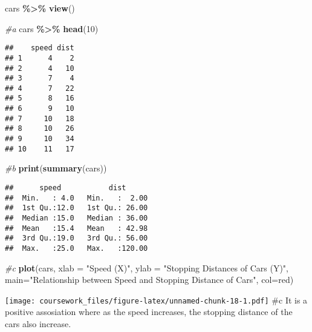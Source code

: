 \documentclass[
]{article}
\newenvironment{Shaded}{\begin{snugshade}}{\end{snugshade}}
\newcommand{\AttributeTok}[1]{\textcolor[rgb]{0.13,0.29,0.53}{#1}}
\newcommand{\CommentTok}[1]{\textcolor[rgb]{0.56,0.35,0.01}{\textit{#1}}}
\newcommand{\DecValTok}[1]{\textcolor[rgb]{0.00,0.00,0.81}{#1}}
\newcommand{\FunctionTok}[1]{\textcolor[rgb]{0.13,0.29,0.53}{\textbf{#1}}}
\newcommand{\NormalTok}[1]{#1}
\newcommand{\SpecialCharTok}[1]{\textcolor[rgb]{0.81,0.36,0.00}{\textbf{#1}}}
\newcommand{\StringTok}[1]{\textcolor[rgb]{0.31,0.60,0.02}{#1}}
\begin{document}
\begin{Shaded}
\begin{Highlighting}[]
\NormalTok{cars }\SpecialCharTok{\%\textgreater{}\%}
  \FunctionTok{view}\NormalTok{()}
\end{Highlighting}
\end{Shaded}

\begin{Shaded}
\begin{Highlighting}[]
\CommentTok{\#a}
\NormalTok{cars }\SpecialCharTok{\%\textgreater{}\%} 
  \FunctionTok{head}\NormalTok{(}\DecValTok{10}\NormalTok{)}
\end{Highlighting}
\end{Shaded}

\begin{verbatim}
##    speed dist
## 1      4    2
## 2      4   10
## 3      7    4
## 4      7   22
## 5      8   16
## 6      9   10
## 7     10   18
## 8     10   26
## 9     10   34
## 10    11   17
\end{verbatim}

\begin{Shaded}
\begin{Highlighting}[]
\CommentTok{\#b}
\FunctionTok{print}\NormalTok{(}\FunctionTok{summary}\NormalTok{(cars))}
\end{Highlighting}
\end{Shaded}

\begin{verbatim}
##      speed           dist       
##  Min.   : 4.0   Min.   :  2.00  
##  1st Qu.:12.0   1st Qu.: 26.00  
##  Median :15.0   Median : 36.00  
##  Mean   :15.4   Mean   : 42.98  
##  3rd Qu.:19.0   3rd Qu.: 56.00  
##  Max.   :25.0   Max.   :120.00
\end{verbatim}

\begin{Shaded}
\begin{Highlighting}[]
\CommentTok{\#c}
\FunctionTok{plot}\NormalTok{(cars, }\AttributeTok{xlab =} \StringTok{"Speed (X)"}\NormalTok{, }\AttributeTok{ylab =} \StringTok{"Stopping Distances of Cars (Y)"}\NormalTok{,}
     \AttributeTok{main=}\StringTok{"Relationship between Speed and Stopping Distance of Cars"}\NormalTok{,}
     \AttributeTok{col=}\StringTok{\textquotesingle{}red\textquotesingle{}}\NormalTok{)}
\end{Highlighting}
\end{Shaded}

\texttt{[image: coursework\_files/figure-latex/unnamed-chunk-18-1.pdf]}
\#c It is a positive assosiation where as the speed increases, the
stopping distance of the cars also increase.
\end{document}
